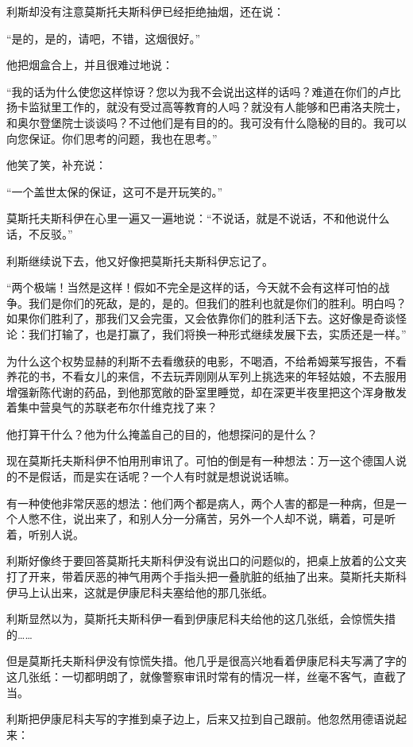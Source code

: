 利斯却没有注意莫斯托夫斯科伊已经拒绝抽烟，还在说：

“是的，是的，请吧，不错，这烟很好。”

他把烟盒合上，并且很难过地说：

“我的话为什么使您这样惊讶？您以为我不会说出这样的话吗？难道在你们的卢比扬卡监狱里工作的，就没有受过高等教育的人吗？就没有人能够和巴甫洛夫院士，和奥尔登堡院士谈谈吗？不过他们是有目的的。我可没有什么隐秘的目的。我可以向您保证。你们思考的问题，我也在思考。”

他笑了笑，补充说：

“一个盖世太保的保证，这可不是开玩笑的。”

莫斯托夫斯科伊在心里一遍又一遍地说：“不说话，就是不说话，不和他说什么话，不反驳。”

利斯继续说下去，他又好像把莫斯托夫斯科伊忘记了。

“两个极端！当然是这样！假如不完全是这样的话，今天就不会有这样可怕的战争。我们是你们的死敌，是的，是的。但我们的胜利也就是你们的胜利。明白吗？如果你们胜利了，那我们又会完蛋，又会依靠你们的胜利活下去。这好像是奇谈怪论：我们打输了，也是打赢了，我们将换一种形式继续发展下去，实质还是一样。”

为什么这个权势显赫的利斯不去看缴获的电影，不喝酒，不给希姆莱写报告，不看养花的书，不看女儿的来信，不去玩弄刚刚从军列上挑选来的年轻姑娘，不去服用增强新陈代谢的药品，到他那宽敞的卧室里睡觉，却在深更半夜里把这个浑身散发着集中营臭气的苏联老布尔什维克找了来？

他打算干什么？他为什么掩盖自己的目的，他想探问的是什么？

现在莫斯托夫斯科伊不怕用刑审讯了。可怕的倒是有一种想法：万一这个德国人说的不是假话，而是实在话呢？一个人有时就是想说说话嘛。

有一种使他非常厌恶的想法：他们两个都是病人，两个人害的都是一种病，但是一个人憋不住，说出来了，和别人分一分痛苦，另外一个人却不说，瞒着，可是听着，听别人说。

利斯好像终于要回答莫斯托夫斯科伊没有说出口的问题似的，把桌上放着的公文夹打了开来，带着厌恶的神气用两个手指头把一叠肮脏的纸抽了出来。莫斯托夫斯科伊马上认出来，这就是伊康尼科夫塞给他的那几张纸。

利斯显然以为，莫斯托夫斯科伊一看到伊康尼科夫给他的这几张纸，会惊慌失措的……

但是莫斯托夫斯科伊没有惊慌失措。他几乎是很高兴地看着伊康尼科夫写满了字的这几张纸：一切都明朗了，就像警察审讯时常有的情况一样，丝毫不客气，直截了当。

利斯把伊康尼科夫写的字推到桌子边上，后来又拉到自己跟前。他忽然用德语说起来：

